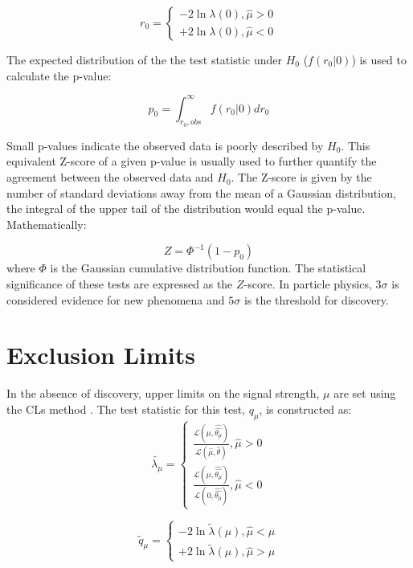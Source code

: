 \begin{equation}
r_{0}=\left\{ \begin{array}{ll}
-2\ln \lambda (0), \hat{\mu} > 0\\
+2\ln \lambda (0), \hat{\mu} < 0
\end{array}
\right.
\end{equation}

The expected distribution of the the test statistic under $H_{0}$ ($f(r_{0}|0)$) is used to calculate the p-value:

\begin{equation}
p_{0}=\int_{r_0,obs}^{\infty} f(r_{0}|0)dr_{0}
\end{equation}

Small p-values indicate the observed data is poorly described by $H_{0}$. This equivalent Z-score of a given p-value is usually used to further quantify the agreement between the observed data and $H_{0}$. The Z-score is given by the number of standard deviations away from the mean of a Gaussian distribution, the integral of the upper tail of the distribution would equal the p-value. Mathematically:

\begin{equation}
Z = \Phi^{-1}(1-p_{0})
\end{equation}
where $\Phi$ is the Gaussian cumulative distribution function. The statistical significance of these tests are expressed as the $Z$-score. In particle physics, $3\sigma$ is considered evidence for new phenomena and $5\sigma$ is the threshold for discovery. 
\section{Exclusion Limits}
In the absence of discovery, upper limits on the signal strength, $\mu$ are set using the CLs method \cite{cls}. The test statistic for this test, $q_{\mu}$, is constructed as:
\begin{equation}
\tilde{\lambda_{\mu}}=\left\{ \begin{array}{ll}
\frac{\mathcal{L}(\mu,\hat{\hat{\theta_{\mu}}})}{\mathcal{L}(\hat{\mu},\hat{\theta})},  \hat{\mu} > 0\\
\frac{\mathcal{L}(\mu,\hat{\hat{\theta_{\mu}}})}{\mathcal{L}(0,\hat{\hat{\theta_{0}}})},  \hat{\mu} < 0
\end{array} 
\right.
\end{equation}
 
 \begin{equation}
\tilde{q}_{\mu}=\left\{ \begin{array}{ll}
-2\ln \tilde{\lambda}(\mu),  \hat{\mu} < \mu \\
+2\ln \tilde{\lambda}(\mu),  \hat{\mu} > \mu 
\end{array}
\right.
\end{equation}
 

